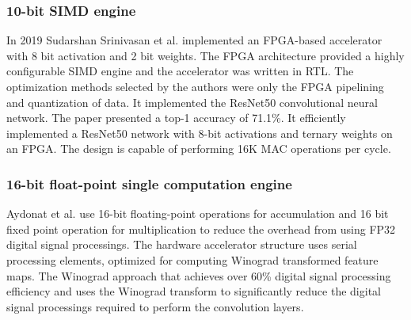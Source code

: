 \subsubsection{10-bit SIMD engine \cite{exampleFPGA1}}
In 2019 Sudarshan Srinivasan et al. implemented an FPGA-based accelerator with 8 bit activation and 2 bit weights. The FPGA architecture provided a highly configurable SIMD engine and the accelerator was written in RTL. The optimization methods selected by the authors were only the FPGA pipelining and quantization of data. It implemented the ResNet50 convolutional neural network. The paper presented a top-1 accuracy of 71.1\%. It efficiently implemented a ResNet50 network with 8-bit activations and ternary weights on an FPGA. The design is capable of performing 16K MAC operations per cycle.

\subsubsection{16-bit float-point single computation engine \cite{exampleFPGA3}}
Aydonat et al. use 16-bit floating-point operations for accumulation and 16 bit fixed point operation
for multiplication to reduce the overhead from using FP32 digital signal processings. The hardware accelerator structure uses serial processing elements, optimized for computing Winograd transformed feature maps. The Winograd approach that achieves over 60\% digital signal processing efficiency and uses the Winograd transform to significantly reduce the digital signal processings required to perform the convolution layers. 
